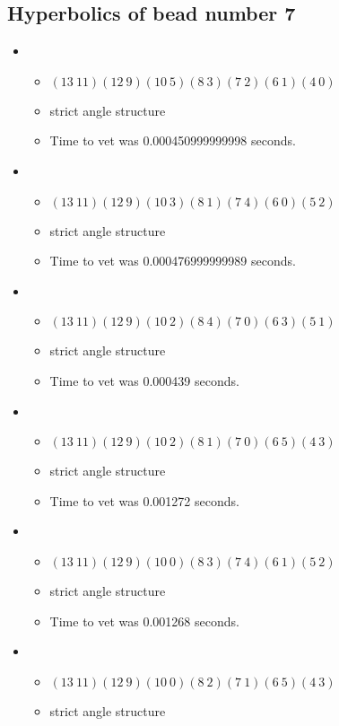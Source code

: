\documentclass{article}
\begin{document}
\subsection{Hyperbolics of bead number 7}
\begin{itemize}
\item \begin{itemize}
      \item $(13\ 11)(12\ 9)(10\ 5)(8\ 3)(7\ 2)(6\ 1)(4\ 0)$
      \item strict angle structure
      \item Time to vet was 0.000450999999998 seconds.
\end{itemize}
\item \begin{itemize}
      \item $(13\ 11)(12\ 9)(10\ 3)(8\ 1)(7\ 4)(6\ 0)(5\ 2)$
      \item strict angle structure
      \item Time to vet was 0.000476999999989 seconds.
\end{itemize}
\item \begin{itemize}
      \item $(13\ 11)(12\ 9)(10\ 2)(8\ 4)(7\ 0)(6\ 3)(5\ 1)$
      \item strict angle structure
      \item Time to vet was 0.000439 seconds.
\end{itemize}
\item \begin{itemize}
      \item $(13\ 11)(12\ 9)(10\ 2)(8\ 1)(7\ 0)(6\ 5)(4\ 3)$
      \item strict angle structure
      \item Time to vet was 0.001272 seconds.
\end{itemize}
\item \begin{itemize}
      \item $(13\ 11)(12\ 9)(10\ 0)(8\ 3)(7\ 4)(6\ 1)(5\ 2)$
      \item strict angle structure
      \item Time to vet was 0.001268 seconds.
\end{itemize}
\item \begin{itemize}
      \item $(13\ 11)(12\ 9)(10\ 0)(8\ 2)(7\ 1)(6\ 5)(4\ 3)$
      \item strict angle structure

\end{itemize}
\end{itemize}
\end{document}
